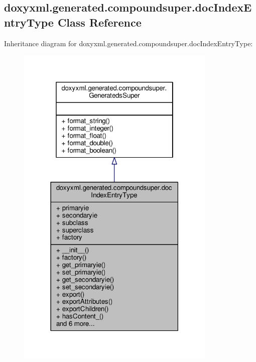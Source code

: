 \subsection{doxyxml.\+generated.\+compoundsuper.\+doc\+Index\+Entry\+Type Class Reference}
\label{classdoxyxml_1_1generated_1_1compoundsuper_1_1docIndexEntryType}


Inheritance diagram for doxyxml.\+generated.\+compoundsuper.\+doc\+Index\+Entry\+Type\+:
\nopagebreak
\begin{figure}[H]
\begin{center}
\leavevmode
\includegraphics[width=270pt]{dc/d7c/classdoxyxml_1_1generated_1_1compoundsuper_1_1docIndexEntryType__inherit__graph}
\end{center}
\end{figure}


